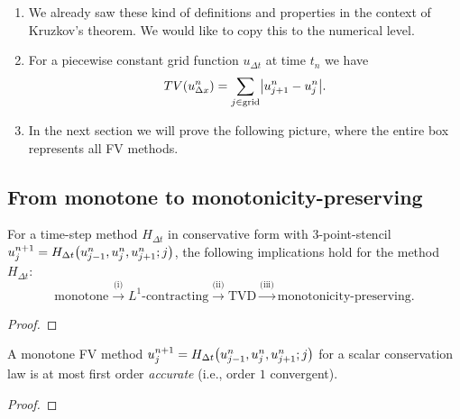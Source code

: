 \begin{remark}
	\begin{enumerate}
		\item We already saw these kind of definitions and properties in the context of Kruzkov's theorem.
		We would like to copy this to the numerical level.
		\item For a piecewise constant grid function \(u_{\Delta t}\) at time \(t_n\) we have
		\[
			TV\parentheses*{u_{\Delta x}^n} = \sum_{j \in \text{grid}}\absolute*{u_{j + 1}^n - u_j^n}.
		\]
		\item In the next section we will prove the following picture, where the entire box represents all FV methods.
		\begin{center}
		\end{center}
	\end{enumerate}
\end{remark}


\subsection{From monotone to monotonicity-preserving}

\begin{theorem}
	For a time-step method \(H_{\Delta t}\) in conservative form with \(3\)-point-stencil \(u_j^{n + 1} = H_{\Delta t}\parentheses*{u_{j - 1}^n, u_j^n, u_{j + 1}^n; j}\), the following implications hold for the method \(H_{\Delta t}\):
	\[
		\text{monotone} \xrightarrow{\text{(i)}} L^1\text{-contracting} \xrightarrow{\text{(ii)}} \text{TVD} \xrightarrow{\text{(iii)}} \text{monotonicity-preserving}.
	\]
\end{theorem}

\begin{proof}
	
\end{proof}

\begin{theorem}
	A monotone FV method \(u_j^{n + 1} = H_{\Delta t}\parentheses*{u_{j - 1}^n, u_j^n, u_{j + 1}^n; j}\) for a scalar conservation law is at most first order \emph{accurate} (i.e., order \(1\) convergent).
\end{theorem}

\begin{proof}
	
\end{proof}

